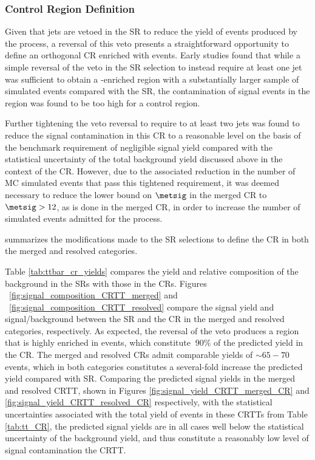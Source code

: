 \subsubsection{\ttbar Control Region Definition}
\label{sec:ttbar_CR_defn}

Given that \btagged jets are vetoed in the SR to reduce the yield of events produced by the \ttbar process, a reversal of this veto presents a straightforward opportunity to define an orthogonal CR enriched with \ttbar events. Early studies found that while a simple reversal of the \bjet veto in the SR selection to instead require at least one \btagged jet was sufficient to obtain a \ttbar-enriched region with a substantially larger sample of simulated \ttbar events compared with the SR, the contamination of signal events in the region was found to be too high for a control region. 

Further tightening the \bjet veto reversal to require to at least two \btagged jets was found to reduce the signal contamination in this \ttbar CR to a reasonable level on the basis of the benchmark requirement of negligible signal yield compared with the statistical uncertainty of the total background yield discussed above in the context of the \wjets CR. However, due to the associated reduction in the number of MC simulated \ttbar events that pass this tightened requirement, it was deemed necessary to reduce the lower bound on \(\metsig\) in the merged \ttbar CR to \(\metsig>12\), as is done in the merged \wjets CR, in order to increase the number of simulated events admitted for the \ttbar process. 

 \Tab{\ref{tab:tt_CR}} summarizes the modifications made to the SR selections to define the \ttbar CR in both the merged and resolved categories. 
 
Table \ref{tab:ttbar_cr_yields} compares the yield and relative composition of the \ttbar background in the SRs with those in the \ttbar CRs. Figures ~\ref{fig:signal_composition_CRTT_merged} and ~\ref{fig:signal_composition_CRTT_resolved} compare the signal yield and signal/background between the SR and the \ttbar CR in the merged and resolved categories, respectively. As expected, the reversal of the \ttbar veto produces a region that is highly enriched in \ttbar events, which constitute \(~90\%\) of the predicted yield in the \ttbar CR. The merged and resolved \ttbar CRs admit comparable yields of \(\sim 65-70\) \ttbar events, which in both categories constitutes a several-fold increase the predicted yield compared with SR. Comparing the predicted signal yields in the merged and resolved CRTT, shown in Figures \ref{fig:signal_yield_CRTT_merged_CR} and \ref{fig:signal_yield_CRTT_resolved_CR} respectively, with the statistical uncertainties associated with the total yield of events in these CRTTs from Table \ref{tab:tt_CR}, the predicted signal yields are in all cases well below the statistical uncertainty of the background yield, and thus constitute a reasonably low level of signal contamination the CRTT.


